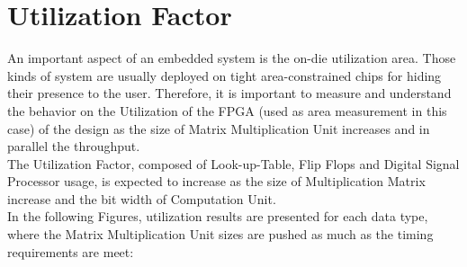 \section{Utilization Factor}
An important aspect of an embedded system is the on-die utilization area. Those kinds of system are usually deployed on tight area-constrained chips for hiding their presence to the user.
Therefore, it is important to measure and understand the behavior on the Utilization of the FPGA (used as area measurement in this case) of the design as the size of Matrix Multiplication Unit increases and in parallel the throughput.\\
The Utilization Factor, composed of Look-up-Table, Flip Flops and Digital Signal Processor usage, is expected to increase as the size of Multiplication Matrix increase and the bit width of Computation Unit.\\
In the following Figures, utilization results are presented for each data type, where the Matrix Multiplication Unit sizes are pushed as much as the timing requirements are meet:

